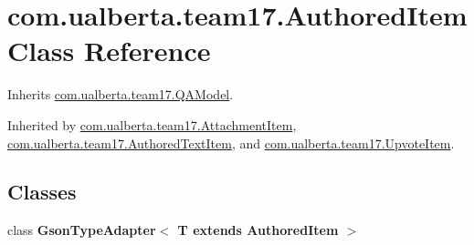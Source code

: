 \hypertarget{classcom_1_1ualberta_1_1team17_1_1_authored_item}{\section{com.\+ualberta.\+team17.\+Authored\+Item Class Reference}
\label{classcom_1_1ualberta_1_1team17_1_1_authored_item}
}


Inherits \hyperlink{classcom_1_1ualberta_1_1team17_1_1_q_a_model}{com.\+ualberta.\+team17.\+Q\+A\+Model}.



Inherited by \hyperlink{classcom_1_1ualberta_1_1team17_1_1_attachment_item}{com.\+ualberta.\+team17.\+Attachment\+Item}, \hyperlink{classcom_1_1ualberta_1_1team17_1_1_authored_text_item}{com.\+ualberta.\+team17.\+Authored\+Text\+Item}, and \hyperlink{classcom_1_1ualberta_1_1team17_1_1_upvote_item}{com.\+ualberta.\+team17.\+Upvote\+Item}.

\subsection*{Classes}
\begin{DoxyCompactItemize}
\item 
class {\bfseries Gson\+Type\+Adapter$<$ T extends Authored\+Item $>$}
\end{DoxyCompactItemize}
